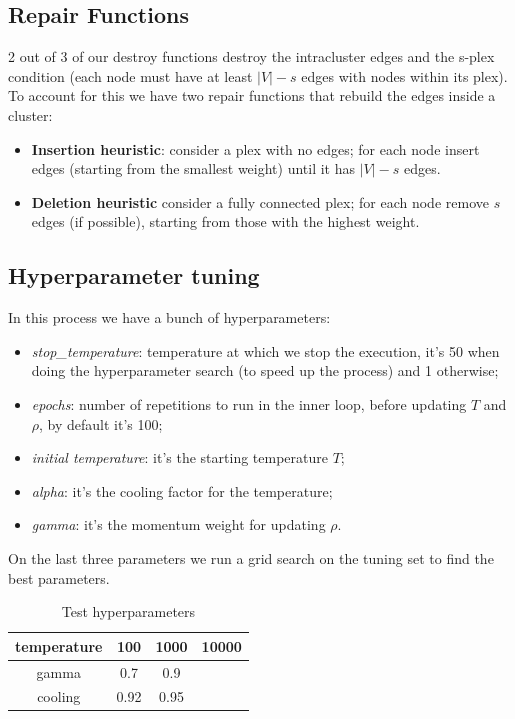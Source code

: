 \documentclass[a4paper,12pt]{article}
\begin{document}
\subsection*{Repair Functions}
2 out of 3 of our destroy functions destroy the intracluster edges and the s-plex condition (each node must have at least $|V|-s$ edges with nodes within its plex).
To account for this we have two repair functions that rebuild the edges inside a cluster:
\begin{itemize}
    \item \textbf{Insertion heuristic}: consider a plex with no edges; for each node insert edges (starting from the smallest weight) until it has $|V|-s$ edges.
    \item \textbf{Deletion heuristic} consider a fully connected plex; for each node remove $s$ edges (if possible), starting from those with the highest weight.
\end{itemize}

\subsection*{Hyperparameter tuning}
In this process we have a bunch of hyperparameters:
\begin{itemize}
    \item \textit{stop\_temperature}: temperature at which we stop the execution, it's 50 when doing the hyperparameter search (to speed up the process) and 1 otherwise;
    \item \textit{epochs}: number of repetitions to run in the inner loop, before updating $T$ and $\rho$, by default it's 100;
    \item \textit{initial temperature}: it's the starting temperature $T$;
    \item \textit{alpha}: it's the cooling factor for the temperature;
    \item \textit{gamma}: it's the momentum weight for updating $\rho$.    
\end{itemize}
On the last three parameters we run a grid search on the tuning set to find the best parameters.


\begin{table}[h]
    \centering
    \begin{tabular}{|c|ccc|}
    \hline
        temperature & 100 & 1000 & 10000\\ \hline
        gamma & 0.7 & 0.9 & \\ \hline
        cooling & 0.92 & 0.95 & \\ \hline
    \end{tabular}
    \caption{Test hyperparameters}
    \label{tab:hyperparameter_grid}
\end{table}
\end{document}

